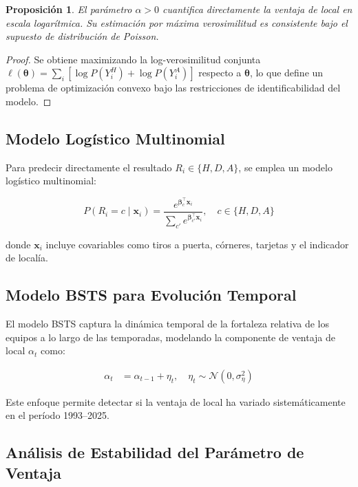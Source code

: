 \documentclass[a4paper,12pt]{article}
\newtheorem{proposition}{Proposición}
\begin{document}
\begin{proposition}
El parámetro $\alpha > 0$ cuantifica directamente la ventaja de local en escala logarítmica. Su estimación por máxima verosimilitud es consistente bajo el supuesto de distribución de Poisson.
\end{proposition}

\begin{proof}
Se obtiene maximizando la log-verosimilitud conjunta $\ell(\boldsymbol{\theta}) = \sum_i \left[\log P(Y_i^H) + \log P(Y_i^A)\right]$ respecto a $\boldsymbol{\theta}$, lo que define un problema de optimización convexo bajo las restricciones de identificabilidad del modelo.
\end{proof}

\subsection{Modelo Logístico Multinomial}

Para predecir directamente el resultado $R_i \in \{H, D, A\}$, se emplea un modelo logístico multinomial:

\begin{equation}
P(R_i = c \mid \mathbf{x}_i) = \frac{e^{\boldsymbol{\beta}_c^\top \mathbf{x}_i}}{\sum_{c'} e^{\boldsymbol{\beta}_{c'}^\top \mathbf{x}_i}}, \quad c \in \{H, D, A\}
\end{equation}

donde $\mathbf{x}_i$ incluye covariables como tiros a puerta, córneres, tarjetas y el indicador de localía.

\subsection{Modelo BSTS para Evolución Temporal}

El modelo BSTS captura la dinámica temporal de la fortaleza relativa de los equipos a lo largo de las temporadas, modelando la componente de ventaja de local $\alpha_t$ como:

\begin{align}
\alpha_t &= \alpha_{t-1} + \eta_t, \quad \eta_t \sim \mathcal{N}(0, \sigma_\eta^2)
\end{align}

Este enfoque permite detectar si la ventaja de local ha variado sistemáticamente en el período 1993--2025.

\subsection{Análisis de Estabilidad del Parámetro de Ventaja}
\end{document}

